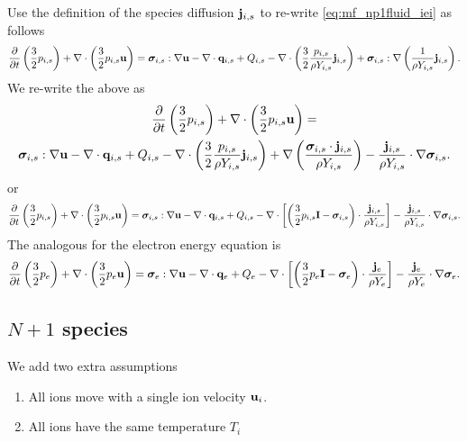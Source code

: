 \documentclass[a4paper,11pt]{report}
\begin{document}
Use the definition of the species diffusion $\mathbf{j}_{i,s}$ to re-write \cref{eq:mf_np1fluid_iei} as follows
\begin{equation*}
    \frac{\partial}{\partial t} \left( \frac{3}{2} p_{i,s} \right) + \nabla \cdot \left( \frac{3}{2} p_{i,s} \mathbf{u} \right) = \bm \sigma_{i,s} : \nabla \mathbf{u} - \nabla \cdot \mathbf{q}_{i,s} + Q_{i,s} - \nabla \cdot \left( \frac{3}{2} \frac{p_{i,s}}{\rho Y_{i,s}} \mathbf{j}_{i,s} \right) + \bm \sigma_{i,s} : \nabla \left( \frac{1}{\rho Y_{i,s}} \mathbf{j}_{i,s} \right).
\end{equation*}
We re-write the above as
\begin{multline*}
    \frac{\partial}{\partial t} \left( \frac{3}{2} p_{i,s} \right) + \nabla \cdot \left( \frac{3}{2} p_{i,s} \mathbf{u} \right) = \\
    \bm \sigma_{i,s} : \nabla \mathbf{u} - \nabla \cdot \mathbf{q}_{i,s} + Q_{i,s} - \nabla \cdot \left( \frac{3}{2} \frac{p_{i,s}}{\rho Y_{i,s}} \mathbf{j}_{i,s} \right) + \nabla \left( \frac{\bm \sigma_{i,s} \cdot \mathbf{j}_{i,s}}{\rho Y_{i,s}} \right) - \frac{\mathbf{j}_{i,s}}{\rho Y_{i,s}} \cdot \nabla \bm \sigma_{i,s}.
\end{multline*}
or
\begin{equation}
    \frac{\partial}{\partial t} \left( \frac{3}{2} p_{i,s} \right) + \nabla \cdot \left( \frac{3}{2} p_{i,s} \mathbf{u} \right) = \bm \sigma_{i,s} : \nabla \mathbf{u} - \nabla \cdot \mathbf{q}_{i,s} + Q_{i,s} - \nabla \cdot \left[ \left( \frac{3}{2} p_{i,s} \mathbf{I} - \bm \sigma_{i,s} \right) \cdot \frac{\mathbf{j}_{i,s}}{\rho Y_{i,s}}  \right] - \frac{\mathbf{j}_{i,s}}{\rho Y_{i,s}} \cdot \nabla \bm \sigma_{i,s}.
\end{equation}
The analogous for the electron energy equation is
\begin{equation}
    \frac{\partial}{\partial t} \left( \frac{3}{2} p_e \right) + \nabla \cdot \left( \frac{3}{2} p_e \mathbf{u} \right) = \bm \sigma_e : \nabla \mathbf{u} - \nabla \cdot \mathbf{q}_e + Q_e - \nabla \cdot \left[ \left( \frac{3}{2} p_e \mathbf{I} - \bm \sigma_e \right) \cdot \frac{\mathbf{j}_e}{\rho Y_e}  \right] - \frac{\mathbf{j}_e}{\rho Y_e} \cdot \nabla \bm \sigma_e.
\end{equation}

\subsection{$N+1$ species}
\label{sec:sf_np1_species}

We add two extra assumptions
\begin{enumerate}
    \item All ions move with a single ion velocity $\mathbf{u}_i$. \label{eq:single_ion_vel}
    \item All ions have the same temperature $T_i$ \label{eq:single_ion_T}
\end{enumerate}
\end{document}
